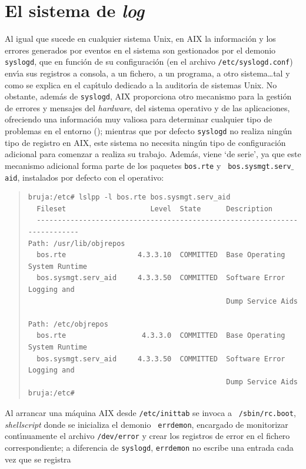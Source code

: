 \section{El sistema de {\it log}}
Al igual que sucede en cualquier sistema Unix, en AIX la informaci\'on y los 
errores generados por eventos en el sistema son gestionados por el demonio {\tt 
syslogd}, que en funci\'on de su configuraci\'on (en el 
archivo {\tt /etc/syslogd.conf}) env\'{\i}a sus
registros a consola, a un fichero, a un programa, a otro sistema\ldots tal y
como se explica en el cap\'{\i}tulo dedicado a la auditor\'{\i}a de sistemas 
Unix. No obstante, adem\'as de {\tt syslogd}, AIX proporciona otro mecanismo 
para la gesti\'on de errores y mensajes del {\it hardware}, del sistema 
operativo y de las aplicaciones, ofreciendo una informaci\'on muy valiosa para
determinar cualquier tipo de problemas en el entorno (\cite{kn:skl01}); mientras
que por defecto {\tt syslogd} no realiza ning\'un tipo de registro en AIX, 
este sistema no necesita ning\'un tipo de configuraci\'on adicional para 
comenzar a realiza su trabajo. Adem\'as, viene `de serie', ya que este 
mecanismo adicional forma parte de los paquetes {\tt bos.rte} y {\tt 
bos.sysmgt.serv$\_$aid}, instalados por defecto con el operativo:
\begin{quote}
\begin{verbatim}
bruja:/etc# lslpp -l bos.rte bos.sysmgt.serv_aid
  Fileset                    Level  State      Description         
  --------------------------------------------------------------------------
Path: /usr/lib/objrepos
  bos.rte                 4.3.3.10  COMMITTED  Base Operating System Runtime
  bos.sysmgt.serv_aid     4.3.3.50  COMMITTED  Software Error Logging and
                                               Dump Service Aids

Path: /etc/objrepos
  bos.rte                  4.3.3.0  COMMITTED  Base Operating System Runtime
  bos.sysmgt.serv_aid     4.3.3.50  COMMITTED  Software Error Logging and
                                               Dump Service Aids
bruja:/etc# 
\end{verbatim}
\end{quote}
Al arrancar una m\'aquina AIX desde {\tt /etc/inittab} se invoca a {\tt 
/sbin/rc.boot}, {\it shellscript} donde se inicializa el demonio {\tt 
errdemon}, 
encargado de monitorizar con\-t\'{\i}\-nua\-men\-te el archivo {\tt /dev/error} 
y crear los registros de error en el fichero correspondiente; a diferencia de
{\tt syslogd}, {\tt errdemon} no escribe una entrada cada vez que se registra
